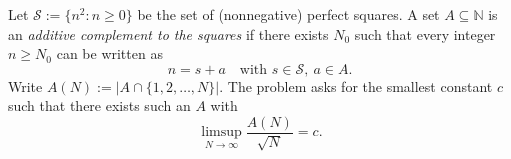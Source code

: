 Let $\mathcal{S}:=\{n^2: n\ge 0\}$ be the set of (nonnegative) perfect squares.
A set $A\subseteq\mathbb{N}$ is an \emph{additive complement to the squares} if there exists $N_0$ such that every integer $n\ge N_0$ can be written as
\[
 n = s + a\quad\text{with }s\in\mathcal{S},\ a\in A.
\]
Write $A(N):=|A\cap\{1,2,\dots,N\}|$.
The problem asks for the smallest constant $c$ such that there exists such an $A$ with
\[
\limsup_{N\to\infty} \frac{A(N)}{\sqrt{N}} = c.
\]
